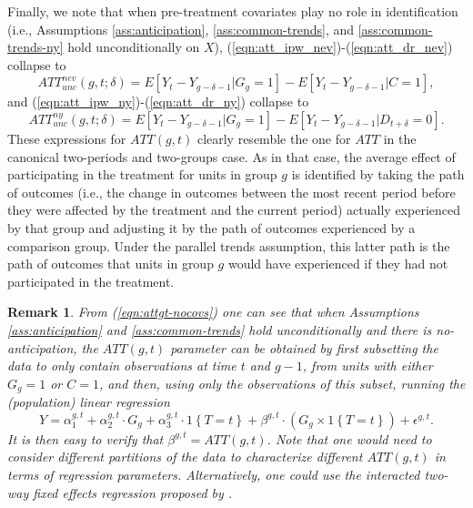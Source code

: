 \documentclass[11pt]{article}%
\theoremstyle{plain}
\newtheorem{remark}{Remark}
\numberwithin{sassumption}{section}
\numberwithin{equation}{section}
\begin{document}
Finally, we note that when pre-treatment covariates play no role in
identification (i.e., Assumptions \ref{ass:anticipation},
\ref{ass:common-trends}, and \ref{ass:common-trends-ny} hold unconditionally on
$X$), (\ref{eqn:att_ipw_nev})-(\ref{eqn:att_dr_nev}) collapse to%
\begin{equation}
ATT_{unc}^{nev}(g,t;\delta)=E[Y_{t}-Y_{g-\delta-1}|G_{g}=1]-E[Y_{t}%
-Y_{g-\delta-1}|C=1], \label{eqn:attgt-nocovs}%
\end{equation}
and (\ref{eqn:att_ipw_ny})-(\ref{eqn:att_dr_ny}) collapse to
\begin{equation}
ATT_{unc}^{ny}(g,t;\delta)=E[Y_{t}-Y_{g-\delta-1}|G_{g}=1]-E[Y_{t}%
-Y_{g-\delta-1}|D_{t+\delta}=0]. \label{eqn:attgt-nocovs-ny}%
\end{equation}
These expressions for $ATT(g,t)$ clearly resemble the one for $ATT$ in the
canonical two-periods and two-groups case. As in that case, the average effect
of participating in the treatment for units in group $g$ is identified by
taking the path of outcomes (i.e., the change in outcomes between the most
recent period before they were affected by the treatment and the current
period) actually experienced by that group and adjusting it by the path of
outcomes experienced by a comparison group. Under the parallel trends
assumption, this latter path is the path of outcomes that units in group $g$
would have experienced if they had not participated in the treatment.

\begin{remark}
\label{Rem:unc}From (\ref{eqn:attgt-nocovs}) one can see that when Assumptions
\ref{ass:anticipation} and \ref{ass:common-trends} hold unconditionally and
there is no-anticipation, the $ATT\left(  g,t\right)  $ parameter can be
obtained by first subsetting the data to only contain observations at time $t$
and $g-1$, from units with either $G_{g}=1$ or $C=1$, and then, using only
the observations of this subset, running the (population) linear regression%
\begin{equation}
Y=\alpha_{1}^{g,t}+\alpha_{2}^{g,t}\cdot G_{g}+\alpha_{3}^{g,t}\cdot1\left\{
T=t\right\}  +\beta^{g,t}\cdot\left(  G_{g}\times1\left\{  T=t\right\}
\right)  +\epsilon^{g,t}. \label{eqn:regression}%
\end{equation}
It is then easy to verify that $\beta^{g,t}=ATT\left(  g,t\right)  $. Note
that one would need to consider different partitions of the data to
characterize different $ATT\left(  g,t\right)  $ in terms of regression
parameters. Alternatively, one could use the interacted two-way fixed effects
regression proposed by \cite{Abraham2018}.
\end{remark}
\end{document}
